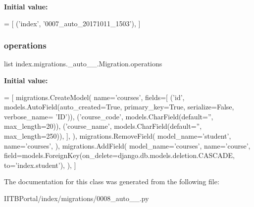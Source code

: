 {\bfseries Initial value\+:}
\begin{DoxyCode}
=  [
        (\textcolor{stringliteral}{'index'}, \textcolor{stringliteral}{'0007\_auto\_20171011\_1503'}),
    ]
\end{DoxyCode}
\mbox{\label{classindex_1_1migrations_1_10008__auto__20171016__0118_1_1Migration_a4ae512aa4bc0e3d81d49eabf9d6f39d5}} 
\subsubsection{\texorpdfstring{operations}{operations}}
{\footnotesize\ttfamily list index.\+migrations.\+\_\+auto\+\_\+\_.\+Migration.\+operations\hspace{0.3cm}{\ttfamily [static]}}

{\bfseries Initial value\+:}
\begin{DoxyCode}
=  [
        migrations.CreateModel(
            name=\textcolor{stringliteral}{'courses'},
            fields=[
                (\textcolor{stringliteral}{'id'}, models.AutoField(auto\_created=\textcolor{keyword}{True}, primary\_key=\textcolor{keyword}{True}, serialize=\textcolor{keyword}{False}, verbose\_name=\textcolor{stringliteral}{
      'ID'})),
                (\textcolor{stringliteral}{'course\_code'}, models.CharField(default=\textcolor{stringliteral}{''}, max\_length=20)),
                (\textcolor{stringliteral}{'course\_name'}, models.CharField(default=\textcolor{stringliteral}{''}, max\_length=250)),
            ],
        ),
        migrations.RemoveField(
            model\_name=\textcolor{stringliteral}{'student'},
            name=\textcolor{stringliteral}{'courses'},
        ),
        migrations.AddField(
            model\_name=\textcolor{stringliteral}{'courses'},
            name=\textcolor{stringliteral}{'course'},
            field=models.ForeignKey(on\_delete=django.db.models.deletion.CASCADE, to=\textcolor{stringliteral}{'index.student'}),
        ),
    ]
\end{DoxyCode}


The documentation for this class was generated from the following file\+:\begin{DoxyCompactItemize}
\item 
I\+I\+T\+B\+Portal/index/migrations/0008\+\_\+auto\+\_\+\_.\+py\end{DoxyCompactItemize}
